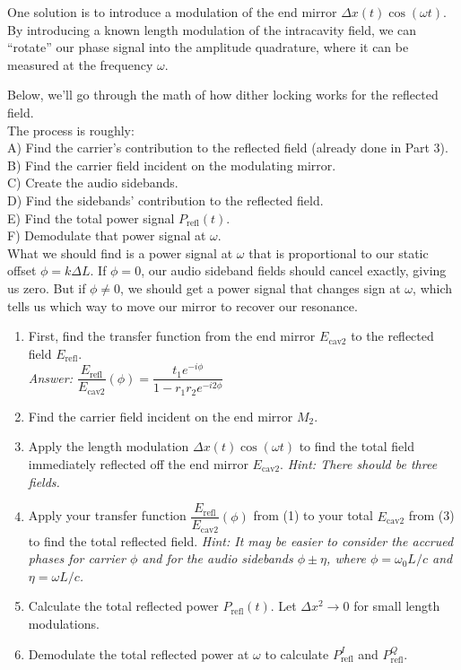 \documentclass[11pt]{article}
\begin{document}
One solution is to introduce a modulation of the end mirror $\Delta x(t) \cos(\omega t)$.
By introducing a known length modulation of the intracavity field, 
we can ``rotate'' our phase signal into the amplitude quadrature, where it can be measured at the frequency $\omega$.

Below, we'll go through the math of how dither locking works for the reflected field.\\
The process is roughly:\\
A) Find the carrier's contribution to the reflected field (already done in Part 3).\\
B) Find the carrier field incident on the modulating mirror.\\
C) Create the audio sidebands.\\
D) Find the sidebands' contribution to the reflected field.\\
E) Find the total power signal $P_\mathrm{refl}(t)$.\\
F) Demodulate that power signal at $\omega$.\\
What we should find is a power signal at $\omega$ that is proportional to our static offset $\phi = k \Delta L$. 
If $\phi = 0$, our audio sideband fields should cancel exactly, giving us zero.
But if $\phi \neq 0$, we should get a power signal that changes sign at $\omega$,
which tells us which way to move our mirror to recover our resonance.


\begin{enumerate}
    \item First, find the transfer function from the end mirror $E_\mathrm{cav2}$ to the reflected field $E_\mathrm{refl}$.\\
    \textit{Answer: $\dfrac{E_\mathrm{refl}}{E_\mathrm{cav2}}(\phi) = \dfrac{t_1 e^{-i \phi}}{1 - r_1 r_2 e^{-i 2 \phi}}$}
    \item Find the carrier field incident on the end mirror $M_2$.
    \item Apply the length modulation $\Delta x(t) \cos(\omega t)$ to find the total field immediately reflected off the end mirror $E_\mathrm{cav2}$.  
    \textit{Hint: There should be three fields.}
    \item Apply your transfer function $\dfrac{E_\mathrm{refl}}{E_\mathrm{cav2}}(\phi)$ from (1) to your total $E_\mathrm{cav2}$ from (3) to find the total reflected field.  
    \textit{Hint: It may be easier to consider the accrued phases for carrier $\phi$ and for the audio sidebands $\phi \pm \eta$, where $\phi = \omega_0 L / c$ and $\eta = \omega L / c$.}
    \item Calculate the total reflected power $P_\mathrm{refl}(t)$.  Let $\Delta x^2 \rightarrow 0$ for small length modulations.
    \item Demodulate the total reflected power at $\omega$ to calculate $P^I_\mathrm{refl}$ and $P^Q_\mathrm{refl}$.  
\end{enumerate}
\end{document}
